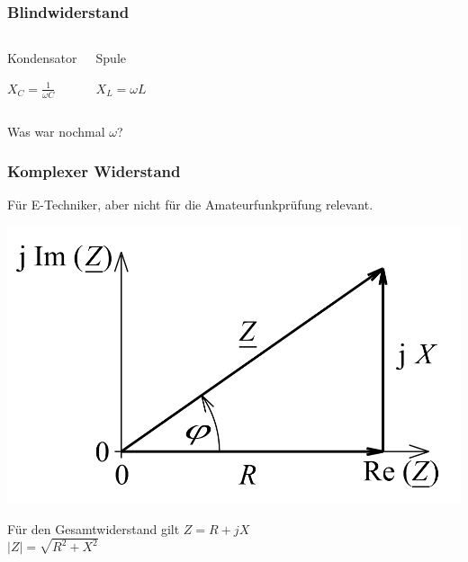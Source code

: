 \begin{frame}
  \frametitle{Blindwiderstand}
  \begin{columns}
    \begin{block}{Kondensator}
      \begin{center}
        \huge{$X_{C} = \frac{1}{\omega C}$}
      \end{center}
    \end{block}

    \begin{block}{Spule}
      \begin{center}
        \huge{$X_{L} = \omega L$}
      \end{center}
    \end{block}
  \end{columns}

  \begin{center}
    \vspace{1cm}
    Was war nochmal $\omega$? \\
  \end{center}
\end{frame}

\begin{frame}
  \frametitle{Komplexer Widerstand}
  Für E-Techniker, aber nicht für die Amateurfunkprüfung relevant.
  \begin{center}
    \includegraphics[width=.8\textwidth,height=.5\textheight,keepaspectratio]{a03/Widerstand_Zeiger.png}
    {\tiny \hyperlink{refs}{\cite{wc}}}
    \begin{block}{Für den Gesamtwiderstand gilt}
      $Z = R + jX$ \\
      $|Z| = \sqrt{R^2 + X^2}$
    \end{block}
  \end{center}
\end{frame}

